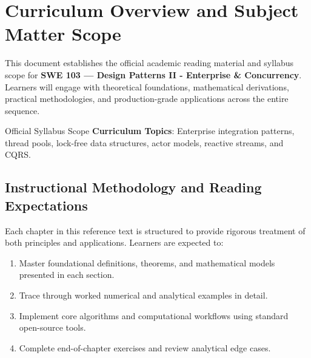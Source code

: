 \section{Curriculum Overview and Subject Matter Scope}

This document establishes the official academic reading material and syllabus scope for \textbf{SWE 103 --- Design Patterns II - Enterprise \& Concurrency}. Learners will engage with theoretical foundations, mathematical derivations, practical methodologies, and production-grade applications across the entire sequence.

\begin{InsightBox}{Official Syllabus Scope}
  \textbf{Curriculum Topics}: Enterprise integration patterns, thread pools, lock-free data structures, actor models, reactive streams, and CQRS.
\end{InsightBox}

\subsection{Instructional Methodology and Reading Expectations}

Each chapter in this reference text is structured to provide rigorous treatment of both principles and applications. Learners are expected to:
\begin{enumerate}
  \item Master foundational definitions, theorems, and mathematical models presented in each section.
  \item Trace through worked numerical and analytical examples in detail.
  \item Implement core algorithms and computational workflows using standard open-source tools.
  \item Complete end-of-chapter exercises and review analytical edge cases.
\end{enumerate}

